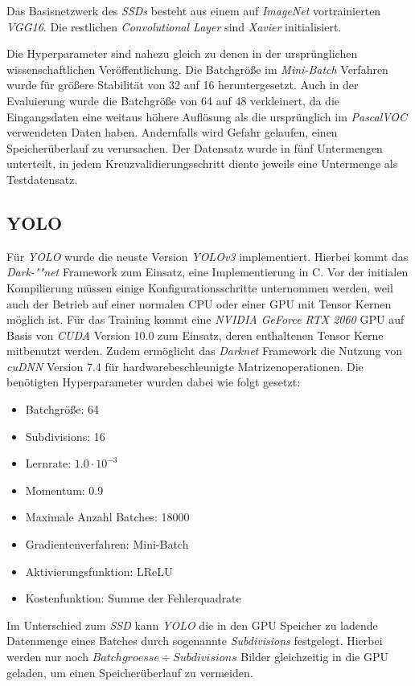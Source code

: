 Das Basisnetzwerk des \textit{SSDs} besteht aus einem auf \textit{ImageNet} vortrainierten \textit{VGG16}. Die restlichen \textit{Convolutional Layer} sind \textit{Xavier} initialisiert. 

Die Hyperparameter sind nahezu gleich zu denen in der ursprünglichen wissenschaftlichen Veröffentlichung. Die Batchgröße im \textit{Mini-Batch} Verfahren wurde für größere Stabilität von 32 auf 16 heruntergesetzt. Auch in der Evaluierung wurde die Batchgröße von 64 auf 48 verkleinert, da die Eingangsdaten eine weitaus höhere Auflösung als die ursprünglich im \textit{PascalVOC} verwendeten Daten haben. Andernfalls wird Gefahr gelaufen, einen Speicherüberlauf zu verursachen. Der Datensatz wurde in fünf Untermengen unterteilt, in jedem Kreuzvalidierungsschritt diente jeweils eine Untermenge als Testdatensatz.

\subsection*{YOLO}

Für \textit{YOLO} wurde die neuste Version \textit{YOLOv3} implementiert. Hierbei kommt das \textit{Dark-""net} Framework zum Einsatz, eine Implementierung in C. Vor der initialen Kompilierung müssen einige Konfigurationsschritte unternommen werden, weil auch der Betrieb auf einer normalen CPU oder einer GPU mit Tensor Kernen möglich ist. Für das Training kommt eine \textit{NVIDIA GeForce RTX 2060} GPU auf Basis von \textit{CUDA} Version 10.0 zum Einsatz, deren enthaltenen Tensor Kerne mitbenutzt werden. Zudem ermöglicht das \textit{Darknet} Framework die Nutzung von \textit{cuDNN} Version 7.4 für hardwarebeschleunigte Matrizenoperationen. Die benötigten Hyperparameter wurden dabei wie folgt gesetzt:

\begin{itemize}
	\item Batchgröße: 64
	\item Subdivisions: 16
	\item Lernrate: $1.0\cdot 10^{-3}$
	\item Momentum: 0.9
	\item Maximale Anzahl Batches: 18000
	\item Gradientenverfahren: Mini-Batch
	\item Aktivierungsfunktion: LReLU
	\item Kostenfunktion: Summe der Fehlerquadrate
\end{itemize}

Im Unterschied zum \textit{SSD} kann \textit{YOLO} die in den GPU Speicher zu ladende Datenmenge eines Batches durch sogenannte \textit{Subdivisions} festgelegt. Hierbei werden nur noch $Batchgroesse \div Subdivisions$ Bilder gleichzeitig in die GPU geladen, um einen Speicherüberlauf zu vermeiden.

